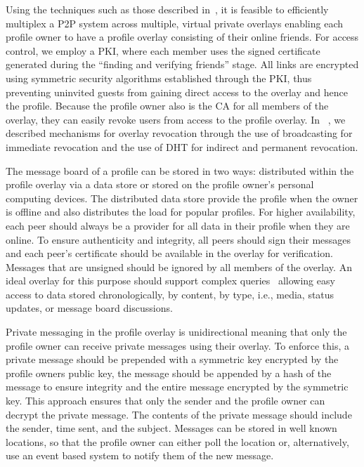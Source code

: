 \documentclass[conference]{IEEEtran}
\begin{document}
Using the techniques such as those described in~\cite{icdcs10}, it is feasible
to efficiently multiplex a P2P system across multiple, virtual private overlays enabling
each profile owner to have a profile overlay consisting of their online friends.
For access control, we employ a PKI, where each member uses the signed certificate
generated during the ``finding and verifying friends'' stage.  All links are
encrypted using symmetric security algorithms established through the PKI,
thus preventing uninvited guests from gaining direct access to the overlay and
hence the profile.  Because the profile owner also is the CA for all members of
the overlay, they can easily revoke users from access to the profile overlay.
In ~\cite{icdcs10}, we described mechanisms for overlay revocation through the
use of broadcasting for immediate revocation and the use of DHT for indirect
and permanent revocation.

The message board of a profile can be stored in two ways: distributed within the
profile overlay via a data store or stored on the profile owner's personal
computing devices.  The distributed data store provide the profile when the
owner is offline and also distributes the load for popular profiles.  For
higher availability, each peer should always be a provider for all data in their
profile when they are online.  To ensure authenticity and integrity, all peers
should sign their messages and each peer's certificate should be available in
the overlay for verification.  Messages that are unsigned should be ignored
by all members of the overlay.  An ideal overlay for this purpose should
support complex queries~\cite{complex_queries} allowing easy access to data
stored chronologically, by content, by type, i.e., media, status updates,
or message board discussions.

Private messaging in the profile overlay is unidirectional meaning that only
the profile owner can receive private messages using their overlay.  To
enforce this, a private message should be prepended with a symmetric key
encrypted by the profile owners public key, the message should be appended
by a hash of the message to ensure integrity and the entire message encrypted
by the symmetric key.  This approach ensures that only the sender and the
profile owner can decrypt the private message.  The contents of the private
message should include the sender, time sent, and the subject.  Messages can
be stored in well known locations, so that the profile owner can either poll
the location or, alternatively, use an event based system to notify them of
the new message.
\end{document}
